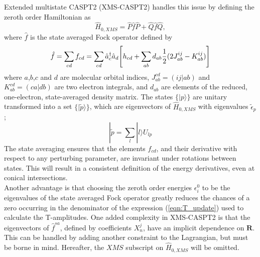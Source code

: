 \documentclass[12pt]{article}
\begin{document}
\noindent Extended multistate CASPT2 (XMS-CASPT2) handles this issue by defining the zeroth order Hamiltonian as
\begin{equation}
\hat{H}_{0,XMS} = \hat{P}\hat{f}\hat{P} +  \hat{Q}\hat{f}\hat{Q},
\end{equation}
where $\hat{f}$ is the state averaged Fock operator defined by
\begin{equation}
\hat{f} = \sum_{cd}f_{cd} = \sum_{cd}
\hat{a}^{\dagger}_{c}\hat{a}_{d}
\Bigg{[} h_{cd} 
+ \sum_{ab}d_{ab}
\frac{1}{2}( 2J^{ij}_{ab}-K^{ij}_{ab})  \Bigg{]}
\end{equation}
where $a$,$b$,$c$ and $d$ are molecular orbital indices,
$J^{cd}_{ab} = (ij|ab)$ and $K^{cd}_{ab} = (ca|db)$ are two electron integrals, and $d_{ab}$ are elements of the reduced, one-electron,
state-averaged density matrix. The states $\{|p\rangle\}$ are unitary transformed into a set $\{|\tilde{p}\rangle\}$, 
which are eigenvectors of $\hat{H}_{0,XMS}$ with eigenvalues $\tilde{\epsilon}_{p}$;
\begin{equation}
|\tilde{p} = \sum_{l}|l\rangle U_{lp}
\end{equation}
The state averaging ensures that the elements $f_{cd}$, and their derivative with respect to any perturbing 
parameter, are invariant under rotations between states. This will result in a consistent definition of 
the energy derivatives, even at conical intersections.\\

\noindent Another advantage is that choosing the zeroth order energies $\epsilon^{0}_{i}$ 
to be the eigenvalues of the state averaged Fock operator greatly reduces the chances 
of a zero occurring in the denominator of the expression (\ref{eqn:T_update}) used to calculate 
the T-amplitudes. One added complexity in XMS-CASPT2 is that the eigenvectors of $\hat{f}^{sa}$, defined by coefficients $X_{n}^{j}$, 
have an implicit dependence on $\mathbf{R}$. This can be handled by adding another constraint to the Lagrangian,
but must be borne in mind. Hereafter, the $XMS$ subscript on $\hat{H}_{0,XMS}$ will be omitted.


\end{document}
